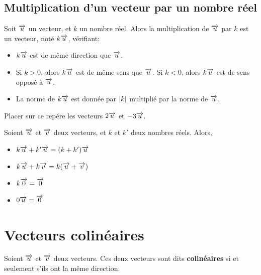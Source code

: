 \documentclass{poly}
\begin{document}
\newpage

\subsection{Multiplication d'un vecteur par un nombre réel}

\begin{definition}
Soit $\overrightarrow{u}$ un vecteur, et $k$ un nombre réel. Alors la multiplication de $\overrightarrow{u}$ par $k$ est un vecteur, noté $k\overrightarrow{u}$, vérifiant:
\begin{itemize}
\item $k\overrightarrow{u}$ est de même direction que $\overrightarrow{u}$.
\item Si $k > 0$, alors $k\overrightarrow{u}$ est de même sens que $\overrightarrow{u}$. Si $k < 0$, alors $k\overrightarrow{u}$ est de sens opposé à $\overrightarrow{u}$.
\item La norme de $k\overrightarrow{u}$ est donnée par $\left\lvert k \right\rvert$ multiplié par la norme de $\overrightarrow{u}$.
\end{itemize}        
\end{definition}
\begin{example}
Placer sur ce repére les vecteurs $2\overrightarrow{u}$ et $-3\overrightarrow{u}$.

\begin{center}
\end{center}
\end{example}

\begin{proposition}
Soient $\overrightarrow{u}$ et $\overrightarrow{v}$ deux vecteurs, et $k$ et $k'$ deux nombres réels. Alors,
\begin{itemize}
\item $k \overrightarrow{u} + k' \overrightarrow{u} = (k + k') \overrightarrow{u}$
\item $k \overrightarrow{u} + k \overrightarrow{v} = k (\overrightarrow{u} + \overrightarrow{v})$
\item $k \overrightarrow{0} = \overrightarrow{0}$
\item $0 \overrightarrow{u} = \overrightarrow{0}$
\end{itemize}
\end{proposition}

\section{Vecteurs colinéaires}
\begin{definition}
Soient $\overrightarrow{u}$ et $\overrightarrow{v}$ deux vecteurs. Ces deux vecteurs sont dits \textbf{colinéaires} si et seulement s'ils ont la même direction.
\end{definition}
\end{document}
